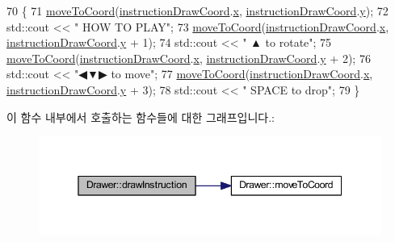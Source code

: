 \begin{DoxyCode}
70     \{
71         \mbox{\hyperlink{class_drawer_ac1a96e007c07cab2e36a7c78484ee9a6}{moveToCoord}}(\mbox{\hyperlink{tetris__drawer_8h_a19714d61f50f7fa80357eba4d88aa69d}{instructionDrawCoord}}.\mbox{\hyperlink{struct_coord_a696eaa744360fc791d0e3b331c549dbe}{x}}, 
      \mbox{\hyperlink{tetris__drawer_8h_a19714d61f50f7fa80357eba4d88aa69d}{instructionDrawCoord}}.\mbox{\hyperlink{struct_coord_a214166cca70cef7dda9201689c3e81ab}{y}});
72         std::cout << \textcolor{stringliteral}{"  HOW TO PLAY"};
73         \mbox{\hyperlink{class_drawer_ac1a96e007c07cab2e36a7c78484ee9a6}{moveToCoord}}(\mbox{\hyperlink{tetris__drawer_8h_a19714d61f50f7fa80357eba4d88aa69d}{instructionDrawCoord}}.\mbox{\hyperlink{struct_coord_a696eaa744360fc791d0e3b331c549dbe}{x}}, 
      \mbox{\hyperlink{tetris__drawer_8h_a19714d61f50f7fa80357eba4d88aa69d}{instructionDrawCoord}}.\mbox{\hyperlink{struct_coord_a214166cca70cef7dda9201689c3e81ab}{y}} + 1);
74         std::cout << \textcolor{stringliteral}{"  ▲ to rotate"};
75         \mbox{\hyperlink{class_drawer_ac1a96e007c07cab2e36a7c78484ee9a6}{moveToCoord}}(\mbox{\hyperlink{tetris__drawer_8h_a19714d61f50f7fa80357eba4d88aa69d}{instructionDrawCoord}}.\mbox{\hyperlink{struct_coord_a696eaa744360fc791d0e3b331c549dbe}{x}}, 
      \mbox{\hyperlink{tetris__drawer_8h_a19714d61f50f7fa80357eba4d88aa69d}{instructionDrawCoord}}.\mbox{\hyperlink{struct_coord_a214166cca70cef7dda9201689c3e81ab}{y}} + 2);
76         std::cout << \textcolor{stringliteral}{"◀▼▶ to move"};
77         \mbox{\hyperlink{class_drawer_ac1a96e007c07cab2e36a7c78484ee9a6}{moveToCoord}}(\mbox{\hyperlink{tetris__drawer_8h_a19714d61f50f7fa80357eba4d88aa69d}{instructionDrawCoord}}.\mbox{\hyperlink{struct_coord_a696eaa744360fc791d0e3b331c549dbe}{x}}, 
      \mbox{\hyperlink{tetris__drawer_8h_a19714d61f50f7fa80357eba4d88aa69d}{instructionDrawCoord}}.\mbox{\hyperlink{struct_coord_a214166cca70cef7dda9201689c3e81ab}{y}} + 3);
78         std::cout << \textcolor{stringliteral}{" SPACE to drop"};
79     \}
\end{DoxyCode}
이 함수 내부에서 호출하는 함수들에 대한 그래프입니다.\+:
\nopagebreak
\begin{figure}[H]
\begin{center}
\leavevmode
\includegraphics[width=345pt]{class_drawer_a4fb74bcad295250c519bb848dd48b0de_cgraph}
\end{center}
\end{figure}
